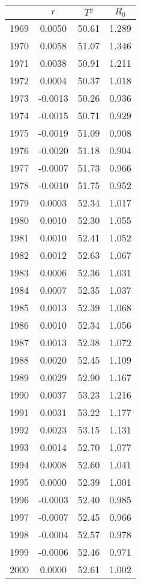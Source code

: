 \begin{tabular}{cccc}
  \hline
 & $r$ & $T^y$ & $R_0$ \\ 
  \hline
1969 & 0.0050 & 50.61 & 1.289 \\ 
  1970 & 0.0058 & 51.07 & 1.346 \\ 
  1971 & 0.0038 & 50.91 & 1.211 \\ 
  1972 & 0.0004 & 50.37 & 1.018 \\ 
  1973 & -0.0013 & 50.26 & 0.936 \\ 
  1974 & -0.0015 & 50.71 & 0.929 \\ 
  1975 & -0.0019 & 51.09 & 0.908 \\ 
  1976 & -0.0020 & 51.18 & 0.904 \\ 
  1977 & -0.0007 & 51.73 & 0.966 \\ 
  1978 & -0.0010 & 51.75 & 0.952 \\ 
  1979 & 0.0003 & 52.34 & 1.017 \\ 
  1980 & 0.0010 & 52.30 & 1.055 \\ 
  1981 & 0.0010 & 52.41 & 1.052 \\ 
  1982 & 0.0012 & 52.63 & 1.067 \\ 
  1983 & 0.0006 & 52.36 & 1.031 \\ 
  1984 & 0.0007 & 52.35 & 1.037 \\ 
  1985 & 0.0013 & 52.39 & 1.068 \\ 
  1986 & 0.0010 & 52.34 & 1.056 \\ 
  1987 & 0.0013 & 52.38 & 1.072 \\ 
  1988 & 0.0020 & 52.45 & 1.109 \\ 
  1989 & 0.0029 & 52.90 & 1.167 \\ 
  1990 & 0.0037 & 53.23 & 1.216 \\ 
  1991 & 0.0031 & 53.22 & 1.177 \\ 
  1992 & 0.0023 & 53.15 & 1.131 \\ 
  1993 & 0.0014 & 52.70 & 1.077 \\ 
  1994 & 0.0008 & 52.60 & 1.041 \\ 
  1995 & 0.0000 & 52.39 & 1.001 \\ 
  1996 & -0.0003 & 52.40 & 0.985 \\ 
  1997 & -0.0007 & 52.45 & 0.966 \\ 
  1998 & -0.0004 & 52.57 & 0.978 \\ 
  1999 & -0.0006 & 52.46 & 0.971 \\ 
  2000 & 0.0000 & 52.61 & 1.002 \\ 

\end{tabular}
